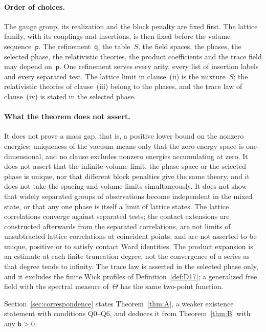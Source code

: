 \paragraph{Order of choices.}
The gauge group, its realization and the block penalty are fixed first. The lattice family, with its couplings and insertions, is then fixed before the volume sequence~$\mathsf p$. The refinement~$\mathsf q$, the table~$S$, the field spaces, the phases, the selected phase, the relativistic theories, the product coefficients and the trace field may depend on~$\mathsf p$. One refinement serves every arity, every list of insertion labels and every separated test. The lattice limit in clause~(ii) is the mixture~$S$; the relativistic theories of clause~(iii) belong to the phases, and the trace law of clause~(iv) is stated in the selected phase.

\paragraph{What the theorem does not assert.}
It does not prove a mass gap, that is, a positive lower bound on the nonzero energies; uniqueness of the vacuum means only that the zero-energy space is one-dimensional, and no clause excludes nonzero energies accumulating at zero. It does not assert that the infinite-volume limit, the phase space or the selected phase is unique, nor that different block penalties give the same theory, and it does not take the spacing and volume limits simultaneously. It does not show that widely separated groups of observations become independent in the mixed state, or that any one phase is itself a limit of lattice states. The lattice correlations converge against separated tests; the contact extensions are constructed afterwards from the separated correlations, are not limits of unsubtracted lattice correlations at coincident points, and are not asserted to be unique, positive or to satisfy contact Ward identities. The product expansion is an estimate at each finite truncation degree, not the convergence of a series as that degree tends to infinity. The trace law is asserted in the selected phase only, and it excludes the finite Wick profiles of Definition~\ref{def:D17}; a generalized free field with the spectral measure of~$\Theta$ has the same two-point function.

Section~\ref{sec:correspondence} states Theorem~\ref{thm:A}, a weaker existence statement with conditions Q0--Q6, and deduces it from Theorem~\ref{thm:B} with any $\mathsf{b}>0$.
